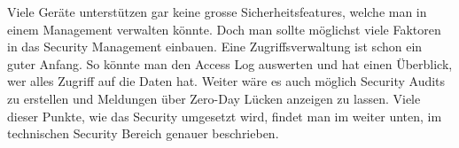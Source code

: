 Viele Geräte unterstützen gar keine grosse Sicherheitsfeatures, welche man in einem Management verwalten könnte. Doch man sollte möglichst viele Faktoren in das Security Management einbauen.
Eine Zugriffsverwaltung ist schon ein guter Anfang. So könnte man den Access Log auswerten und hat einen Überblick, wer alles Zugriff auf die Daten hat. Weiter wäre es auch möglich Security Audits zu erstellen und Meldungen über Zero-Day Lücken anzeigen zu lassen. Viele dieser Punkte, wie das Security umgesetzt wird, findet man im weiter unten, im technischen Security Bereich genauer beschrieben.